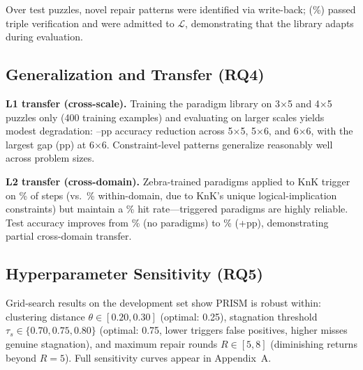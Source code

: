 Over  test puzzles,  novel repair patterns were identified via write-back;  (\%) passed triple verification and were admitted to $\mathcal{L}$, demonstrating that the library adapts during evaluation.

\subsection{Generalization and Transfer (RQ4)}
\label{ssec:transfer}

\textbf{L1 transfer (cross-scale).} Training the paradigm library on 3$\times$5 and 4$\times$5 puzzles only (400 training examples) and evaluating on larger scales yields modest degradation: --pp accuracy reduction across 5$\times$5, 5$\times$6, and 6$\times$6, with the largest gap (pp) at 6$\times$6. Constraint-level patterns generalize reasonably well across problem sizes.

\textbf{L2 transfer (cross-domain).} Zebra-trained paradigms applied to KnK trigger on \% of steps (vs.\ \% within-domain, due to KnK's unique logical-implication constraints) but maintain a \% hit rate—triggered paradigms are highly reliable. Test accuracy improves from \% (no paradigms) to \% (+pp), demonstrating partial cross-domain transfer.

\subsection{Hyperparameter Sensitivity (RQ5)}

Grid-search results on the development set show PRISM is robust within: clustering distance $\theta \in [0.20, 0.30]$ (optimal: 0.25), stagnation threshold $\tau_s \in \{0.70, 0.75, 0.80\}$ (optimal: 0.75, lower triggers false positives, higher misses genuine stagnation), and maximum repair rounds $R \in [5, 8]$ (diminishing returns beyond $R = 5$). Full sensitivity curves appear in Appendix~A.
